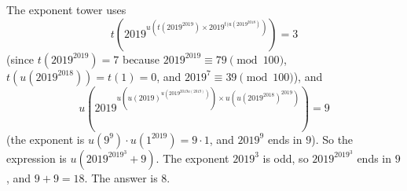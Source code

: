 The exponent tower uses
\[
t\left(2019^{u(t(2019^{2019}) \times 2019^{t(u(2019^{2018})})}\right)=3
\]
(since $t(2019^{2019})=7$ because $2019^{2019}\equiv79\pmod{100}$, $t(u(2019^{2018}))=t(1)=0$, and $2019^7\equiv39\pmod{100}$), and
\[
u\left(2019^{u(u(2019)^{u(2019^{2019 u(2019)})}) \times u(u(2019^{2018})^{2019})}\right)=9
\]
(the exponent is $u(9^9)\cdot u(1^{2019})=9\cdot1$, and $2019^9$ ends in $9$). So the expression is $u\left(2019^{2019^3}+9\right)$. The exponent $2019^3$ is odd, so $2019^{2019^3}$ ends in $9$, and $9+9=18$. The answer is $\boxed{8}$.
